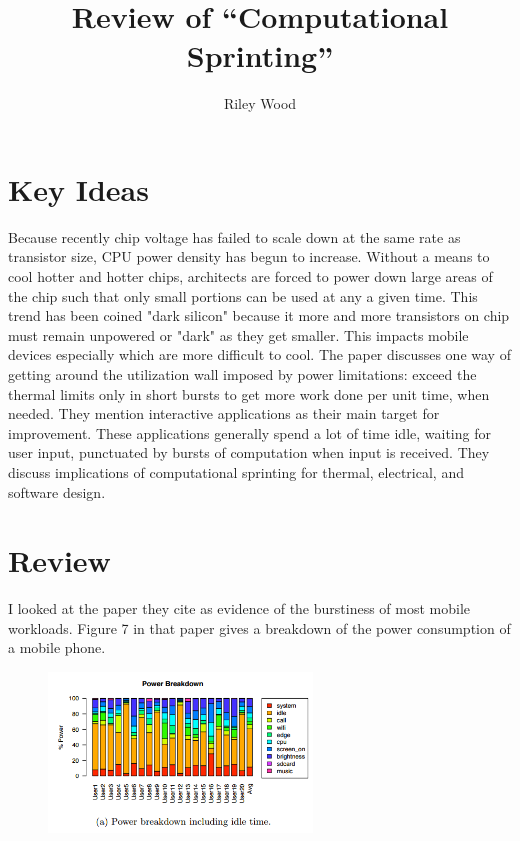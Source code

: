 \documentclass{article}
\title{Review of ``Computational Sprinting'' \cite{sprinting}}
\author{Riley Wood}
\begin{document}
\maketitle


\section*{Key Ideas}
Because recently chip voltage has failed to scale down at the same rate as
transistor size, CPU power density has begun to increase. Without a means to
cool hotter and hotter chips, architects are forced to power down large areas of
the chip such that only small portions can be used at any a given time. This trend has been
coined "dark silicon" because it more and more transistors on chip must remain
unpowered or "dark" as they get smaller. This impacts mobile devices especially
which are more difficult to cool. The paper discusses one way of getting around
the utilization wall imposed by power limitations: exceed the thermal limits
only in short bursts to get more work done per unit time, when needed. They
mention interactive applications as their main target for improvement. These
applications generally spend a lot of time idle, waiting for user input,
punctuated by bursts of computation when input is received. They discuss
implications of computational sprinting for thermal, electrical, and software
design.

\section*{Review}
I looked at the paper they cite \cite{40} as evidence of the burstiness of most
mobile workloads. Figure 7 in that paper gives a breakdown of the power
consumption of a mobile phone.

\begin{figure}[h!]
    \centering
    \includegraphics[width=7cm]{mobile_workload_breakdown}
\end{figure}
\end{document}
